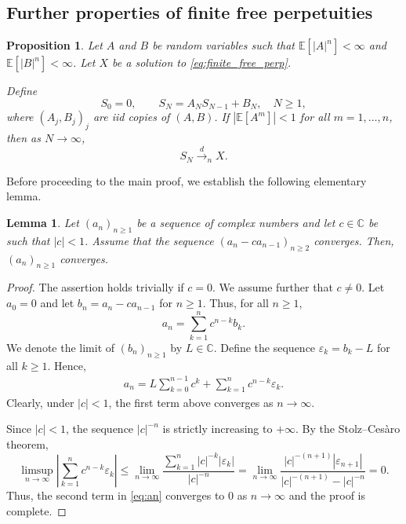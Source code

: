 \documentclass[a4paper,11pt]{amsart}
\numberwithin{equation}{section}
\newtheorem{lemma}[theorem]{Lemma}
\newtheorem{proposition}[theorem]{Proposition}
\newcommand{\C}{\mathbb{C}}
\newcommand{\E}{\mathbb{E}}
\begin{document}
\subsection{Further properties of finite free perpetuities}
\begin{proposition}\label{prop:lim_E[S_N^k]}
   Let \(A\) and \(B\) be random variables such that
\(\E[|A|^{n}]<\infty\) and \(\E[|B|^{n}]<\infty\). Let 
$X$ be a solution to \eqref{eq:finite_free_perp}. 

Define   
\[
S_0=0,\qquad S_N= A_N S_{N-1}+B_N, \quad N\geq 1,
    \]
 where $(A_j,B_j)_j$ are iid copies of $(A,B)$. 
If $|\E[A^m]|<1$ for all $m=1,\ldots,n$, then as $N\to\infty$,
\[
S_N\xrightarrow{d}_n X.
\]
\end{proposition}

Before proceeding to the main proof, we establish the following elementary lemma.

\begin{lemma}\label{elementary_lemma}
    Let $(a_n)_{n \ge 1}$ be a sequence of complex numbers and let $c \in\C$ be such that $|c|<1$. Assume that the sequence $(a_n - ca_{n-1})_{n\ge 2}$ converges. Then, $(a_n)_{n\ge 1}$ converges.
\end{lemma}
\begin{proof}
The assertion holds trivially if $c=0$. We assume further that $c\neq 0$.
    Let $a_0=0$ and let $b_n=a_n-ca_{n-1}$ for $n\ge 1$. Thus, for all $n\ge 1$, 
    \[a_n=\sum_{k=1}^{n}c^{n-k}b_k.
    \]
    We denote the limit of $(b_n)_{n\ge 1}$ by $L\in\C$. Define the sequence $\varepsilon_k = b_k-L$ for all $k\ge 1$. Hence,
    \begin{align}\label{eq:an}
    a_n = L\sum_{k=0}^{n-1}c^k+\sum_{k=1}^n
c^{n-k}\varepsilon_k.    
\end{align}
Clearly, under $|c|<1$, the first term above converges as $n\to\infty$. 

Since $|c| < 1$, the sequence $|c|^{-n}$ is strictly increasing to $+\infty$. 
By the Stolz–Ces\`aro theorem,
\[
\limsup_{n \to \infty} \left| \sum_{k=1}^n c^{n-k} \varepsilon_k \right| \leq 
\lim_{n \to \infty} \frac{\sum_{k=1}^n |c|^{-k} |\varepsilon_k|}{|c|^{-n}} = 
\lim_{n \to \infty} \frac{|c|^{-(n+1)} |\varepsilon_{n+1}|}{|c|^{-(n+1)} - |c|^{-n}} = 0.
\]
Thus, the second term in \eqref{eq:an} converges to $0$ as $n\to\infty$ and the proof is complete.
\end{proof}
\end{document}
